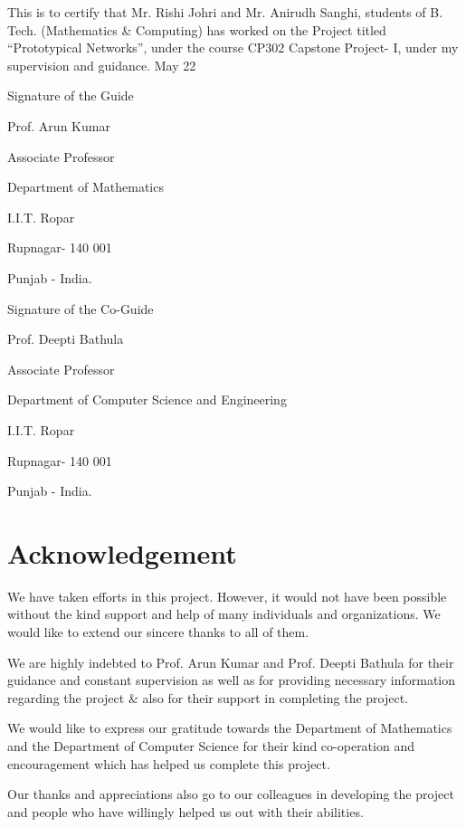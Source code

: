 This is to certify that Mr. Rishi Johri and Mr. Anirudh Sanghi,  students of B. Tech. (Mathematics \& Computing) has worked on the Project titled “Prototypical Networks”, under the course CP302 Capstone Project- I, under my supervision and guidance.
\newline
May 22
\vspace{2cm}
\begin{flushright}
Signature of the Guide

Prof. Arun Kumar

Associate Professor

Department of Mathematics

I.I.T. Ropar

Rupnagar- 140 001

Punjab - India.

\end{flushright}
\vspace{2cm}
\begin{flushright}
Signature of the Co-Guide

Prof. Deepti Bathula

Associate Professor

Department of Computer Science and Engineering

I.I.T. Ropar

Rupnagar- 140 001

Punjab - India.
\end{flushright}

\newpage
\section*{Acknowledgement}

We have taken efforts in this project. However, it would not have been possible without the kind support and help of many individuals and organizations. We would like to extend our sincere thanks to all of them.

We are highly indebted to Prof. Arun Kumar and Prof. Deepti Bathula for their guidance and constant supervision as well as for providing necessary information regarding the project \& also for their support in completing the project.

We would like to express our gratitude towards the Department of Mathematics and the Department of  Computer Science for their kind co-operation and encouragement which has helped us complete this project.

Our thanks and appreciations also go to our colleagues in developing the project and people who have willingly helped us out with their abilities.

